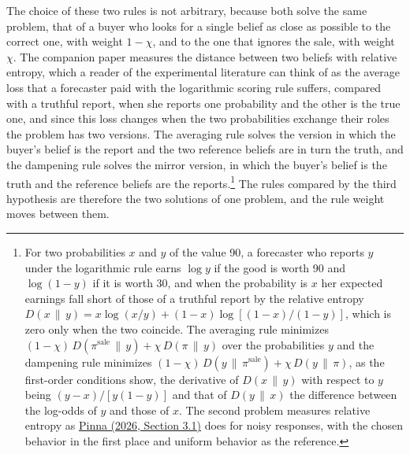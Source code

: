 \documentclass[11pt,a4paper]{article}
\newcommand{\cy}[2]{\hyperlink{cite.#1}{\textcolor{citecolor}{#2}}}
\newcommand{\psale}{\pi^{\mathrm{sale}}}
\begin{document}
The choice of these two rules is not arbitrary, because both solve the same problem, that of a buyer who looks for a single belief as close as possible to the correct one, with weight $1-\chi$, and to the one that ignores the sale, with weight $\chi$. The companion paper measures the distance between two beliefs with relative entropy, which a reader of the experimental literature can think of as the average loss that a forecaster paid with the logarithmic scoring rule suffers, compared with a truthful report, when she reports one probability and the other is the true one, and since this loss changes when the two probabilities exchange their roles the problem has two versions. The averaging rule solves the version in which the buyer's belief is the report and the two reference beliefs are in turn the truth, and the dampening rule solves the mirror version, in which the buyer's belief is the truth and the reference beliefs are the reports.\footnote{For two probabilities $x$ and $y$ of the value 90, a forecaster who reports $y$ under the logarithmic rule earns $\log y$ if the good is worth 90 and $\log(1-y)$ if it is worth 30, and when the probability is $x$ her expected earnings fall short of those of a truthful report by the relative entropy $D(x\,\|\,y)=x\log(x/y)+(1-x)\log[(1-x)/(1-y)]$, which is zero only when the two coincide. The averaging rule minimizes $(1-\chi)\,D(\psale\,\|\,y)+\chi\,D(\pi\,\|\,y)$ over the probabilities $y$ and the dampening rule minimizes $(1-\chi)\,D(y\,\|\,\psale)+\chi\,D(y\,\|\,\pi)$, as the first-order conditions show, the derivative of $D(x\,\|\,y)$ with respect to $y$ being $(y-x)/[y(1-y)]$ and that of $D(y\,\|\,x)$ the difference between the log-odds of $y$ and those of $x$. The second problem measures relative entropy as \cy{pinna}{Pinna (2026, Section 3.1)} does for noisy responses, with the chosen behavior in the first place and uniform behavior as the reference.} The rules compared by the third hypothesis are therefore the two solutions of one problem, and the rule weight moves between them.
\end{document}
